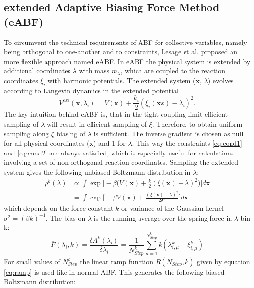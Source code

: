 \subsection{extended Adaptive Biasing Force Method (eABF)}
\label{sec:eABF}
To circumvent the technical requirements of ABF for collective variables, namely being orthogonal to one-another and to constraints, Lesage et al.\autocite{lesage2017smoothed} proposed an more flexible approach named eABF.
In eABF the physical system is extended by additional coordinates $\lambda$ with mass $m_{\lambda}$, which are coupled to the reaction coordinates $\xi_i$ with harmonic potentials. The extended system ($\textbf{x}$, $\lambda$) evolves according to Langevin dynamics in the extended potential
\begin{equation}
  V^{ext}(\textbf{x},\lambda_i) = V(\textbf{x}) + \frac{k_i}{2}(\xi_{i}(\textbf{x}x)-\lambda_i)^2.
\end{equation}
The key intuition behind eABF is, that in the tight coupling limit efficient sampling of $\lambda$ will result in efficient sampling of $\xi$. Therefore, to obtain uniform sampling along $\xi$ biasing of $\lambda$ is sufficient. The inverse gradient is chosen as null for all physical coordinates ($\textbf{x}$) and 1 for $\lambda$. This way the constraints \ref{eq:cond1} and \ref{eq:cond2} are always satisfied, which is especially useful for calculations involving a set of non-orthogonal reaction coordinates.
Sampling the extended system gives the following unbiased Boltzmann distribution in $\lambda$:
\begin{equation}
\begin{aligned}
  \rho^k(\lambda) &\propto
  \int \exp \biggl[-\beta \biggl(V(\textbf{x})+\frac{k}{2}(\xi(\textbf{x})-\lambda)^2 \biggr) \biggr] d\textbf{x} \\
  &= \int \exp \biggl[-\beta V(\textbf{x})+\frac{(\xi(\textbf{x})-\lambda)^2}{2\sigma^2} \biggr] d\textbf{x}
\end{aligned}
\end{equation}
which depends on the force constant $k$ or variance of the Gaussian kernel $\sigma^2=(\beta k)^{-1}$.
The bias on $\lambda$ is the running average over the spring force in $\lambda$-bin k:
\begin{equation}
  \overline{F}(\lambda_{i}, k) = \frac{\delta A^{k}(\lambda_{i})}{\delta \lambda_i} = \frac{1}{N_{Step}^{k}} \sum_{\mu=1}^{N_{Step}^{k}} k(\lambda_{i,\mu}^{k}-\xi_{i,\mu}^{k})
\end{equation}
For small values of $N_{Step}^{k}$ the linear ramp function $R(N_{Step},k)$ given by equation \ref{eq:ramp} is used like in normal ABF. This generates the following biased Boltzmann distribution:
